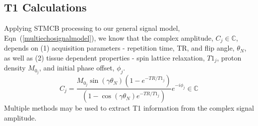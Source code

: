 \documentclass[10pt]{amsart}
\newcommand{\eqn}[1]{(\ref{#1})}
\begin{document}
\subsection{T1 Calculations}
Applying STMCB processing
to our general signal model, Eqn~\eqn{multiechosignalmodel},
 we know that
the complex amplitude,
$C_j \in \mathbb{C}$, 
depends on (1) acquisition parameters - repetition time, TR,
and flip angle, $\theta_N$, as well as (2) tissue dependent properties -
 spin lattice relaxation,  $T1_j$,
 proton density $M_{0_j}$, and
 initial phase offset, $\phi_j$.
\[
C_j = \frac{M_{0_j} \sin \left(\gamma \theta_N \right)\left( 1- e^{-TR/T1_j}\right)}{\left( 1- \cos \left(\gamma \theta_N \right) e^{-TR/T1_j}\right)}
e^{-i  \phi_j} 
\in  \mathbb{C} 
\]
Multiple methods may be used to extract T1 information from the complex
signal amplitude.
\end{document}
